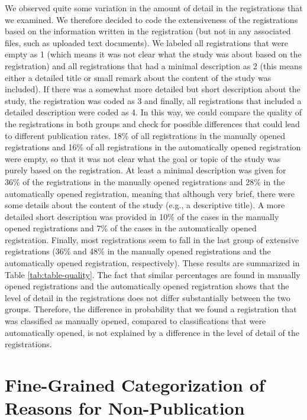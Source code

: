 \documentclass[
  ,jou, a4paper,floatsintext]{apa6}
\begin{document}
We observed quite some variation in the amount of detail in the registrations that we examined. We therefore decided to code the extensiveness of the registrations based on the information written in the registration (but not in any associated files, such as uploaded text documents). We labeled all registrations that were empty as 1 (which means it was not clear what the study was about based on the registration) and all registrations that had a minimal description as 2 (this means either a detailed title or small remark about the content of the study was included). If there was a somewhat more detailed but short description about the study, the registration was coded as 3 and finally, all registrations that included a detailed description were coded as 4. In this way, we could compare the quality of the registrations in both groups and check for possible differences that could lead to different publication rates. 18\% of all registrations in the manually opened registrations and 16\% of all registrations in the automatically opened registration were empty, so that it was not clear what the goal or topic of the study was purely based on the registration. At least a minimal description was given for 36\% of the registrations in the manually opened registrations and 28\% in the automatically opened registration, meaning that although very brief, there were some details about the content of the study (e.g., a descriptive title). A more detailed short description was provided in 10\% of the cases in the manually opened registrations and 7\% of the cases in the automatically opened registration. Finally, most registrations seem to fall in the last group of extensive registrations (36\% and 48\% in the manually opened registrations and the automatically opened registration, respectively). These results are summarized in Table \ref{tab:table-quality}. The fact that similar percentages are found in manually opened registrations and the automatically opened registration shows that the level of detail in the registrations does not differ substantially between the two groups. Therefore, the difference in probability that we found a registration that was classified as manually opened, compared to classifications that were automatically opened, is not explained by a difference in the level of detail of the registrations.

\hypertarget{fine-grained-categorization-of-reasons-for-non-publication}{%
\section{Fine-Grained Categorization of Reasons for Non-Publication}\label{fine-grained-categorization-of-reasons-for-non-publication}}
\end{document}
